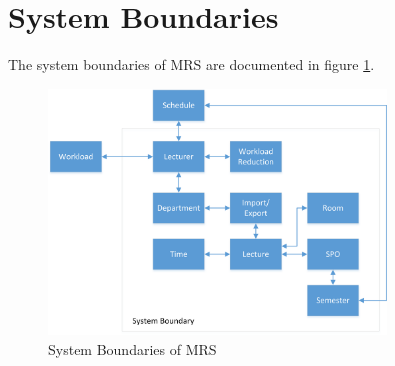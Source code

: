 \clearpage

\section{System Boundaries}
The system boundaries of MRS are documented in figure \ref{fig:systemboundaries}.

\begin{figure}[h]
	\centering
	\includegraphics[width=0.8\textwidth]{images/systemboundaries}
	\caption{System Boundaries of MRS}
	\label{fig:systemboundaries}
\end{figure}
